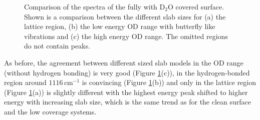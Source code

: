 \documentclass[11pt,DIV=13,BCOR=5mm,a4paper,headinclude]{scrbook}
\begin{document}
 \begin{figure} [!h]
 \centering
              \quad
              \quad
 \caption{Comparison of the spectra of the fully with D$_2$O covered surface.
Shown is a comparison between the different slab sizes for (a) the lattice region, (b) the low energy OD range with butterfly like vibrations and (c) the high energy OD range.
The omitted regions do not contain peaks.} 
        \label{abb:fullyhydrox_spec}
\end{figure}
As before, the agreement between different sized slab models in the OD range (without hydrogen bonding) is very good (Figure \ref{abb:fullyhydrox_spec}(c)), in the hydrogen-bonded region around $1116\,$cm$^{-1}$ is convincing (Figure \ref{abb:fullyhydrox_spec}(b)) and only in the lattice region (Figure \ref{abb:fullyhydrox_spec}(a)) is slightly different with the highest energy peak shifted to higher energy with increasing slab size, which is the same trend as for the clean surface and the low coverage systems.
\end{document}
